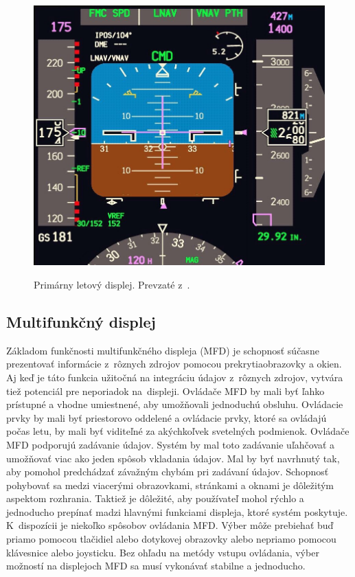 \begin{figure}[ht]
\centering
\includegraphics[scale=0.25]{obrazky-figures/PFD.png}
\caption{Primárny letový displej. Prevzaté z~\cite{fotoPFD}.}{\label{PFD}}
\end{figure}
\newpage

\subsection{Multifunkčný displej}
Základom funkčnosti multifunkčného displeja (MFD) je schopnosť súčasne prezentovať informácie z~rôznych zdrojov pomocou prekrytiaobrazovky a okien. Aj keď je táto funkcia užitočná na integráciu údajov z~rôznych zdrojov, vytvára tiež potenciál pre neporiadok na~displeji. Ovládače MFD by mali byť ľahko prístupné a vhodne umiestnené, aby umožňovali jednoduchú obsluhu. Ovládacie prvky by mali byť priestorovo oddelené a ovládacie prvky, ktoré sa ovládajú počas letu, by mali byť viditeľné za akýchkoľvek svetelných podmienok. Ovládače MFD podporujú zadávanie údajov. Systém by mal toto zadávanie uľahčovať a umožňovať viac ako jeden spôsob vkladania údajov. Mal by byť navrhnutý tak, aby pomohol predchádzať závažným chybám pri zadávaní údajov. Schopnosť pohybovať sa medzi viacerými obrazovkami, stránkami a oknami je dôležitým aspektom rozhrania. Taktiež je dôležité, aby používateľ mohol rýchlo a jednoducho prepínať madzi hlavnými funkciami displeja, ktoré systém poskytuje. K~dispozícii je niekoľko spôsobov ovládania MFD. Výber môže prebiehať buď priamo pomocou tlačidiel alebo dotykovej obrazovky alebo nepriamo pomocou klávesnice alebo joysticku. Bez ohľadu na metódy vstupu ovládania, výber možností na displejoch MFD sa musí vykonávať stabilne a jednoducho.

